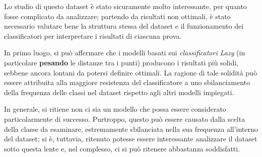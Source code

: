 \documentclass[a4paper,11pt,twoside,notitlepage,final]{scrartcl}
\begin{document}
Lo studio di questo dataset è stato sicuramente molto interessante, per quanto fosse complicato da analizzare;
partendo da risultati non ottimali, è stato necessario valutare bene la struttura stessa del dataset e il funzionamento
dei classificatori per interpretare i risultati di ciascuna prova.

In primo luogo, si può affermare che i modelli basati sui \emph{classificatori Lazy} (in particolare \textbf{pesando} le distanze tra i punti) producono i risultati più solidi,
sebbene ancora lontani da potersi definire ottimali.
La ragione di tale solidità può essere attribuita alla maggiore resistenza del classificatore a uno sbilanciamento della frequenza delle classi nel dataset rispetto agli altri modelli impiegati.

In generale, si ritiene non ci sia un modello che possa essere considerato particolarmente di successo.
Purtroppo, questo può essere causato dalla scelta della classe da esaminare, estremamente sbilanciata nella sua frequenza all'interno del dataset;
si è, tuttavia, ritenuto potesse essere interessante analizzare il dataset sotto questa lente e, nel complesso, ci si può ritenere abbastanza soddisfatti.
\end{document}
